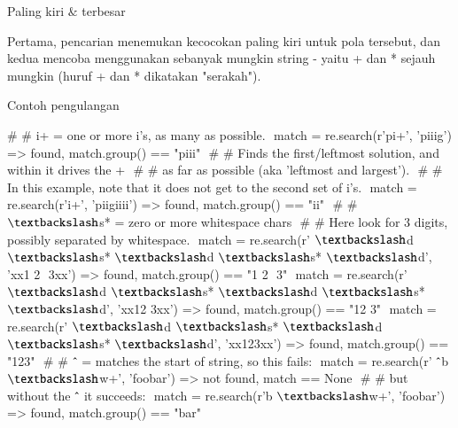 \documentclass[a4paper,12pt]{report}
\begin{document}
\noindent 
Paling kiri  $  \&  $ terbesar \par
\noindent 
\vspace{12pt}
\noindent 
Pertama, pencarian menemukan kecocokan paling kiri untuk pola tersebut, dan kedua mencoba menggunakan sebanyak mungkin string - yaitu + dan * sejauh mungkin (huruf + dan * dikatakan "serakah"). \par
\noindent 
Contoh pengulangan \par
\noindent 
\vspace{12pt}
\noindent 
{\fontsize{10pt}{10pt}\selectfont  $  \#  $ $  \#  $ i+ = one or more i's, as many as possible.\vspace{\baselineskip}
 $  $ match = re.search(r'pi+', 'piiig') =>  $  $found, match.group() == "piii"\vspace{\baselineskip}
\vspace{\baselineskip}
 $  $  $  \#  $ $  \#  $ Finds the first/leftmost solution, and within it drives the +\vspace{\baselineskip}
 $  $  $  \#  $ $  \#  $ as far as possible (aka 'leftmost and largest').\vspace{\baselineskip}
 $  $  $  \#  $ $  \#  $ In this example, note that it does not get to the second set of i's.\vspace{\baselineskip}
 $  $ match = re.search(r'i+', 'piigiiii') =>  $  $found, match.group() == "ii"\vspace{\baselineskip}
\vspace{\baselineskip}
 $  $  $  \#  $ $  \#  $  $  \textbackslash  $s* = zero or more whitespace chars\vspace{\baselineskip}
 $  $  $  \#  $ $  \#  $ Here look for 3 digits, possibly separated by whitespace.\vspace{\baselineskip}
 $  $ match = re.search(r' $  \textbackslash  $d $  \textbackslash  $s* $  \textbackslash  $d $  \textbackslash  $s* $  \textbackslash  $d', 'xx1 2  $  $ 3xx') =>  $  $found, match.group() == "1 2  $  $ 3"\vspace{\baselineskip}
 $  $ match = re.search(r' $  \textbackslash  $d $  \textbackslash  $s* $  \textbackslash  $d $  \textbackslash  $s* $  \textbackslash  $d', 'xx12  $  $3xx') =>  $  $found, match.group() == "12  $  $3"\vspace{\baselineskip}
 $  $ match = re.search(r' $  \textbackslash  $d $  \textbackslash  $s* $  \textbackslash  $d $  \textbackslash  $s* $  \textbackslash  $d', 'xx123xx') =>  $  $found, match.group() == "123"\vspace{\baselineskip}
\vspace{\baselineskip}
 $  $  $  \#  $ $  \#  $  $  \string^  $ = matches the start of string, so this fails:\vspace{\baselineskip}
 $  $ match = re.search(r' $  \string^  $b $  \textbackslash  $w+', 'foobar') =>  $  $not found, match == None\vspace{\baselineskip}
 $  $  $  \#  $ $  \#  $ but without the  $  \string^  $ it succeeds:\vspace{\baselineskip}
 $  $ match = re.search(r'b $  \textbackslash  $w+', 'foobar') =>  $  $found, match.group() == "bar"} \par
\end{document}
